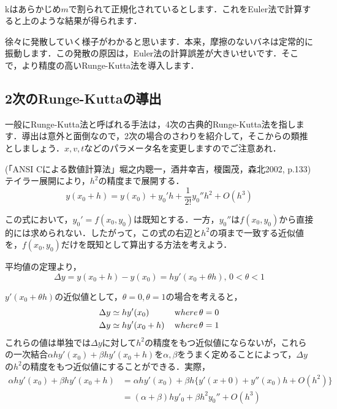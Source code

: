 \documentclass[11pt,dvipdfmx]{jsarticle}
\begin{document}
    \begin{center}
    \end{center}
    { \hspace*{\fill} \\}
    
    kはあらかじめ\(m\)で割られて正規化されているとします．これをEuler法で計算すると上のような結果が得られます．

徐々に発散していく様子がわかると思います．本来，摩擦のないバネは定常的に振動します．この発散の原因は，Euler法の計算誤差が大きいせいです．そこで，より精度の高いRunge-Kutta法を導入します．

    \subsection{2次のRunge-Kuttaの導出}\label{ux6b21ux306erunge-kuttaux306eux5c0eux51fa}

一般にRunge-Kutta法と呼ばれる手法は，4次の古典的Runge-Kutta法を指します．導出は意外と面倒なので，2次の場合のさわりを紹介して，そこからの類推としましょう．\(x,v,t\)などのパラメータ名を変更しますのでご注意あれ．

(「ANSI Cによる数値計算法」堀之内聰一，酒井幸吉，榎園茂，森北2002,
p.133) テイラー展開により，\(h^2\)の精度まで展開する． \[
y(x_0+h) = y(x_0) +y_0'h+\frac{1}{2!}y_0''h^2 + O(h^3)
\]

この式において，\(y_0' = f(x_0,y_0)\)は既知とする．一方，\(y_0''\)は\(f(x_0,y_0)\)から直接的には求められない．したがって，この式の右辺と\(h^2\)の項まで一致する近似値を，\(f(x_0,y_0)\)だけを既知として算出する方法を考えよう．

平均値の定理より， \[
\Delta y = y(x_0+h)-y(x_0) = hy'(x_0 + \theta h), \, 0<\theta<1
\]

\(y'(x_0 +\theta h)\)の近似値として，\(\theta=0, \theta=1\)の場合を考えると，
\[
\begin{aligned}
\Delta y &\simeq hy'(x_0) \, &{\textrm where}\, &\theta=0\\
\Delta y &\simeq hy'(x_0+h)  \, &{\textrm where}\, &\theta=1
\end{aligned}
\]
これらの値は単独では\(\Delta y\)に対して\(h^2\)の精度をもつ近似値にならないが，これらの一次結合\(\alpha h y'(x_0)+\beta hy'(x_0+h)\)を\(\alpha, \beta\)をうまく定めることによって，\(\Delta y\)の\(h^2\)の精度をもつ近似値にすることができる．実際，
\[
\begin{aligned}
\alpha h y'(x_0)+\beta hy'(x_0+h) & =\alpha h y'(x_0)+\beta h \{y'(x+0)+y''(x_0)h+O(h^2)\} \\
& =(\alpha+\beta)hy'_0 + \beta h^2 y_0'' + O(h^3)
\end{aligned}
\]
\end{document}
